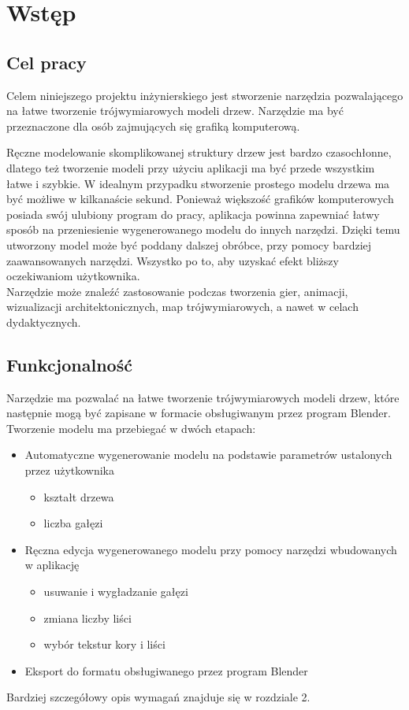 \chapter{Wstęp}

\section{Cel pracy}
Celem niniejszego projektu inżynierskiego jest stworzenie narzędzia pozwalającego na łatwe 
tworzenie trójwymiarowych modeli drzew. Narzędzie ma być przeznaczone dla osób zajmujących
się grafiką komputerową.

Ręczne modelowanie skomplikowanej struktury drzew jest bardzo czasochłonne,
dlatego też tworzenie modeli przy użyciu aplikacji ma być przede wszystkim łatwe i szybkie.
W idealnym przypadku stworzenie prostego modelu drzewa ma być możliwe w kilkanaście sekund. Ponieważ większość
grafików komputerowych posiada swój ulubiony program do pracy, aplikacja powinna zapewniać
łatwy sposób na przeniesienie wygenerowanego modelu do innych narzędzi.
Dzięki temu utworzony model może być poddany dalszej obróbce, przy pomocy bardziej zaawansowanych narzędzi. Wszystko po to, aby uzyskać
efekt bliższy oczekiwaniom użytkownika.
\\ \indent Narzędzie może znaleźć zastosowanie podczas tworzenia gier, animacji, wizualizacji architektonicznych, map trójwymiarowych, a nawet w celach dydaktycznych.


\newpage
\section{Funkcjonalność}
Narzędzie ma pozwalać na łatwe tworzenie trójwymiarowych modeli drzew, które następnie mogą być zapisane
w formacie obsługiwanym przez program Blender. Tworzenie modelu ma przebiegać w dwóch etapach:
\begin{itemize}
	\item{Automatyczne wygenerowanie modelu na podstawie parametrów ustalonych przez użytkownika}
	\begin{itemize}
		\item{kształt drzewa}
		\item{liczba gałęzi}
	\end{itemize}
	\item{Ręczna edycja wygenerowanego modelu przy pomocy narzędzi wbudowanych w aplikację}
	\begin{itemize}
		\item{usuwanie  i wygładzanie gałęzi}
		\item{zmiana liczby liści}
		\item{wybór tekstur kory i liści}
	\end{itemize}

	\item{Eksport do formatu obsługiwanego przez program Blender}
\end{itemize}
Bardziej szczegółowy opis wymagań znajduje się w rozdziale 2.


